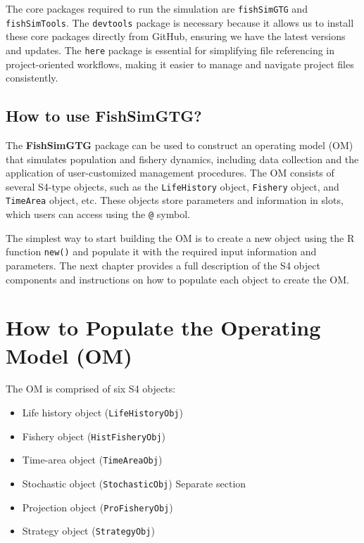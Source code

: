 \documentclass[
]{book}
\providecommand{\tightlist}{%
  \setlength{\itemsep}{0pt}\setlength{\parskip}{0pt}}
\begin{document}
The core packages required to run the simulation are \texttt{fishSimGTG} and \texttt{fishSimTools}. The \texttt{devtools} package is necessary because it allows us to install these core packages directly from GitHub, ensuring we have the latest versions and updates. The \texttt{here} package is essential for simplifying file referencing in project-oriented workflows, making it easier to manage and navigate project files consistently.

\section{How to use FishSimGTG?}\label{how-to-use-fishsimgtg}

The \textbf{FishSimGTG} package can be used to construct an operating model (OM) that simulates population and fishery dynamics, including data collection and the application of user-customized management procedures. The OM consists of several S4-type objects, such as the \texttt{LifeHistory} object, \texttt{Fishery} object, and \texttt{TimeArea} object, etc. These objects store parameters and information in slots, which users can access using the \texttt{@} symbol.

The simplest way to start building the OM is to create a new object using the R function \texttt{new()} and populate it with the required input information and parameters. The next chapter provides a full description of the S4 object components and instructions on how to populate each object to create the OM.

\chapter{How to Populate the Operating Model (OM)}\label{OM-pop}

The OM is comprised of six S4 objects:

\begin{itemize}
\tightlist
\item
  Life history object (\texttt{LifeHistoryObj})
\item
  Fishery object (\texttt{HistFisheryObj})
\item
  Time-area object (\texttt{TimeAreaObj})
\item
  Stochastic object (\texttt{StochasticObj})
  Separate section
\item
  Projection object (\texttt{ProFisheryObj})
\item
  Strategy object (\texttt{StrategyObj})
\end{itemize}
\end{document}
